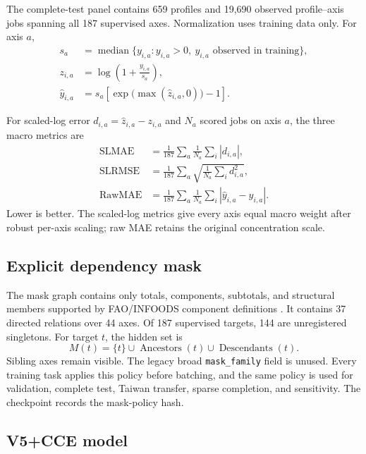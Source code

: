 \documentclass[11pt]{article}
\newcommand{\SLMAE}{\operatorname{SLMAE}}
\newcommand{\SLRMSE}{\operatorname{SLRMSE}}
\newcommand{\RawMAE}{\operatorname{RawMAE}}
\begin{document}
The complete-test panel contains 659 profiles and 19,690 observed profile--axis jobs spanning all 187 supervised axes. Normalization uses training data only. For axis $a$,
\begin{align}
  s_a &= \operatorname{median}\{y_{i,a}:y_{i,a}>0,\ y_{i,a}\text{ observed in training}\},\\
  z_{i,a} &= \log\left(1+\frac{y_{i,a}}{s_a}\right),\\
  \hat y_{i,a} &= s_a\left[\exp\bigl(\max(\hat z_{i,a},0)\bigr)-1\right].
\end{align}

For scaled-log error $d_{i,a}=\hat z_{i,a}-z_{i,a}$ and $N_a$ scored jobs on axis $a$, the three macro metrics are
\begin{align}
\SLMAE &= \frac{1}{187}\sum_a\frac{1}{N_a}\sum_i|d_{i,a}|,\\
\SLRMSE &= \frac{1}{187}\sum_a\sqrt{\frac{1}{N_a}\sum_i d_{i,a}^2},\\
\RawMAE &= \frac{1}{187}\sum_a\frac{1}{N_a}\sum_i|\hat y_{i,a}-y_{i,a}|.
\end{align}
Lower is better. The scaled-log metrics give every axis equal macro weight after robust per-axis scaling; raw MAE retains the original concentration scale.

\subsection{Explicit dependency mask}

The mask graph contains only totals, components, subtotals, and structural members supported by FAO/INFOODS component definitions \cite{infoodstags}. It contains 37 directed relations over 44 axes. Of 187 supervised targets, 144 are unregistered singletons. For target $t$, the hidden set is
\begin{equation}
  M(t)=\{t\}\cup\operatorname{Ancestors}(t)\cup\operatorname{Descendants}(t).
\end{equation}
Sibling axes remain visible. The legacy broad \texttt{mask\_family} field is unused. Every training task applies this policy before batching, and the same policy is used for validation, complete test, Taiwan transfer, sparse completion, and sensitivity. The checkpoint records the mask-policy hash.

\subsection{V5+CCE model}
\end{document}
